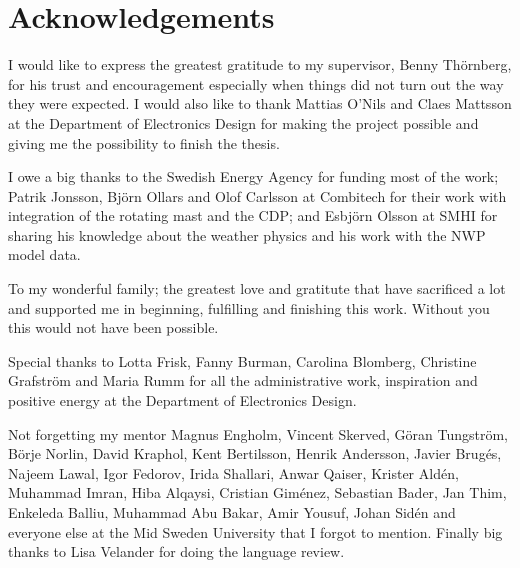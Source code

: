 
\chapter{Acknowledgements}

I would like to express the greatest gratitude to my supervisor, Benny Thörnberg, for his trust and encouragement especially when things did not turn out the way they were expected.
I would also like to thank Mattias O'Nils and Claes Mattsson at the Department of Electronics Design for making the project possible and giving me the possibility to finish the thesis.

I owe a big thanks to the Swedish Energy Agency for funding most of the work; Patrik Jonsson, Björn Ollars and Olof Carlsson at Combitech for their work with integration of the rotating mast and the CDP; and Esbjörn Olsson at SMHI for sharing his knowledge about the weather physics and his work with the NWP model data.

To my wonderful family; the greatest love and gratitute that have sacrificed a lot and supported me in beginning, fulfilling and finishing this work. Without you this would not have been possible.

Special thanks to Lotta Frisk, Fanny Burman, Carolina Blomberg, Christine Grafström and Maria Rumm for all the administrative work, inspiration and positive energy at the Department of Electronics Design.

Not forgetting my mentor Magnus Engholm, Vincent Skerved, Göran Tungström, Börje Norlin, David Kraphol, Kent Bertilsson, Henrik Andersson, Javier Brugés, Najeem Lawal, Igor Fedorov, Irida Shallari, Anwar Qaiser, Krister Aldén, Muhammad Imran, Hiba Alqaysi, Cristian Giménez, Sebastian Bader, Jan Thim, Enkeleda Balliu, Muhammad Abu Bakar, Amir Yousuf, Johan Sidén and everyone else at the Mid Sweden University that I forgot to mention. Finally big thanks to Lisa Velander for doing the language review.